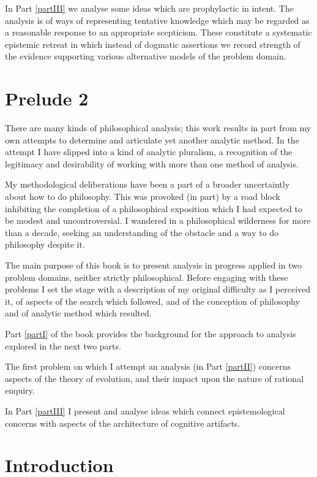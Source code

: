 In Part \ref{partIII} we analyse some ideas which are prophylactic in intent.
The analysis is of ways of representing tentative knowledge which may be regarded as a reasonable response to an appropriate scepticism.
These constitute a systematic epistemic retreat in which instead of dogmatic assertions we record strength of the evidence supporting various alternative models of the problem domain.

\chapter{Prelude 2}

There are many kinds of philosophical analysis;
this work results in part from my own attempts to determine and articulate yet another analytic method.
In the attempt I have slipped into a kind of analytic pluralism, a recognition of the legitimacy and desirability of working with more than one method of analysis.

My methodological deliberations have been a part of a broader uncertaintly about how to do philosophy.
This was provoked (in part) by a road block inhibiting the completion of a philosophical exposition which I had expected to be modest and uncontroversial.
I wandered in a philosophical wilderness for more than a decade, seeking an understanding of the obstacle and a way to do philosophy despite it.

The main purpose of this book is to present analysis in progress applied in two problem domains, neither strictly philosophical.
Before engaging with these problems I set the stage with a description of my original difficulty as I perceived it, of aspects of the search which followed, and of the conception of philosophy and of analytic method which resulted.

Part \ref{partI} of the book provides the background for the approach to analysis explored in the next two parts.

The first problem on which I attempt an analysis (in Part \ref{partII}) concerns aspects of the theory of evolution, and their impact upon the nature of rational enquiry.

In Part \ref{partIII} I present and analyse ideas which connect epistemological concerns with aspects of the architecture of cognitive artifacts.

\chapter{Introduction}

